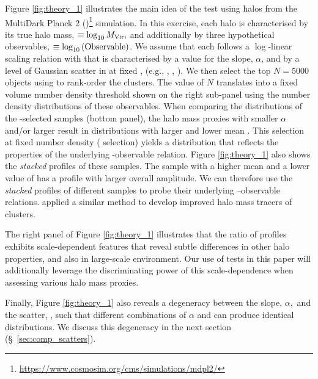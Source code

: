 \documentclass[fleqn,usenatbib,useAMS]{mnras}
\begin{document}
    Figure \ref{fig:theory_1} illustrates the main idea of the \topn{} test using halos from the
    MultiDark Planck 2 ()\footnote{\url{https://www.cosmosim.org/cms/simulations/mdpl2/}} 
    simulation. 
    In this exercise, each halo is characterised by its true halo mass, \haloSym{}$\equiv
    \log_{10}M_{\rm Vir},$ and additionally by three hypothetical observables, \obsSym{}$\equiv
    \log_{10}{(\rm Observable)}$.
    We assume that each \obsSym{} follows a $\log$-linear scaling relation with \mvir{} that is
    characterised by a value for the slope, $\alpha$, and by a level of Gaussian scatter in
    \obsSym{} at fixed \haloSym{}, \scatterObsSymMhalo{} (e.g., \citealt{Lieu2016},
    \citealt{Ziparo2016}, \citealt{Evrard2014, Farahi2018}).
    We then select the top $N=5000$ objects using \obsSym{} to rank-order the clusters.
    The value of $N$ translates into a fixed volume number density threshold shown on the
    right sub-panel using the number density distributions of these observables.
    When comparing the \mvir{} distributions of the \topn{}-selected samples (bottom panel), the
    halo mass proxies with smaller $\alpha$ and/or larger \scatterObsSymMhalo{} result in \mvir{}
    distributions with larger \scatterMhaloObsSym{} and lower mean \mvir{}.
    This selection at fixed number density (\topn{} selection) yields a \mvir{} distribution that
    reflects the properties of the underlying \mvir{}-observable relation.
    Figure \ref{fig:theory_1} also shows the \emph{stacked} \dsigma{} profiles of these \topn{}
    samples.
    The \topn{} sample with a higher mean \mvir{} and a lower value of \scatterMhaloObsSym{} has a 
    \dsigma{} profile with larger overall amplitude.
    We can therefore use the \emph{stacked} \dsigma{} profiles of different \topn{} samples to probe
    their underlying \mvir{}--observable relations. 
    \citet[][]{Reyes2008} applied a similar method to develop improved halo mass tracers of
    clusters.
    
    The right panel of Figure \ref{fig:theory_1} illustrates that the ratio of \dsigma{} profiles
    exhibits scale-dependent features that reveal subtle differences in other halo properties, and
    also in large-scale environment. 
    Our use of \topn{} tests in this paper will additionally leverage the discriminating power of
    this scale-dependence when assessing various halo mass proxies.

    Finally, Figure \ref{fig:theory_1} also reveals a degeneracy between the slope, $\alpha,$ and
    the scatter, \scatterObsSymMhalo{}, such that different combinations of $\alpha$ and
    \scatterObsSymMhalo{} can produce identical \mvir{} distributions.
    We discuss this degeneracy in the next section (\S\ \ref{sec:comp_scatters}).
\end{document}
